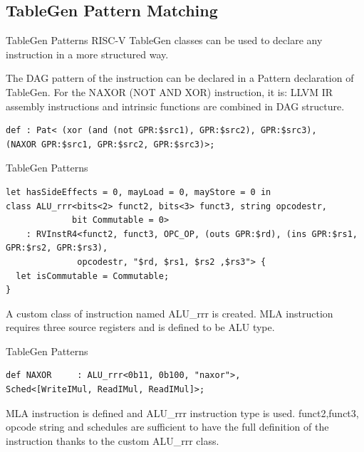 \subsection{TableGen Pattern Matching}
\begin{frame}[fragile]{TableGen Patterns}
RISC-V TableGen classes can be used to declare any instruction in a more structured way.
\par
The DAG pattern of the instruction can be declared in a Pattern declaration of TableGen. For the NAXOR (NOT AND XOR) instruction, it is: LLVM IR assembly instructions and intrinsic functions are combined in DAG structure.

\begin{lstlisting}
def : Pat< (xor (and (not GPR:$src1), GPR:$src2), GPR:$src3),
(NAXOR GPR:$src1, GPR:$src2, GPR:$src3)>;
\end{lstlisting}
\end{frame}

        
        

\begin{frame}[fragile]{TableGen Patterns}
\begin{lstlisting}
let hasSideEffects = 0, mayLoad = 0, mayStore = 0 in
class ALU_rrr<bits<2> funct2, bits<3> funct3, string opcodestr,
             bit Commutable = 0>
    : RVInstR4<funct2, funct3, OPC_OP, (outs GPR:$rd), (ins GPR:$rs1, GPR:$rs2, GPR:$rs3),
              opcodestr, "$rd, $rs1, $rs2 ,$rs3"> {
  let isCommutable = Commutable;
}
\end{lstlisting}
A custom class of instruction named ALU\_rrr is created. MLA instruction requires three source registers and is defined to be ALU type. 
\end{frame}


        
\begin{frame}[fragile]{TableGen Patterns}
\begin{lstlisting}
def NAXOR     : ALU_rrr<0b11, 0b100, "naxor">,
Sched<[WriteIMul, ReadIMul, ReadIMul]>;
\end{lstlisting}
MLA instruction is defined and ALU\_rrr instruction type is used. funct2,funct3, opcode string and schedules are sufficient to have the full definition of the instruction thanks to the custom ALU\_rrr class.
\end{frame}



